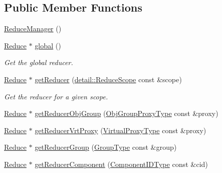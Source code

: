 \subsection*{Public Member Functions}
\begin{DoxyCompactItemize}
\item 
\hyperlink{structvt_1_1collective_1_1reduce_1_1_reduce_manager_a28e777d1b70bc4e2d369db4ed3df76ab}{Reduce\+Manager} ()
\item 
\hyperlink{structvt_1_1collective_1_1reduce_1_1_reduce}{Reduce} $\ast$ \hyperlink{structvt_1_1collective_1_1reduce_1_1_reduce_manager_afa3c814ff0e1c7ef1a9f76ed4036512b}{global} ()
\begin{DoxyCompactList}\small\item\em Get the global reducer. \end{DoxyCompactList}\item 
\hyperlink{structvt_1_1collective_1_1reduce_1_1_reduce}{Reduce} $\ast$ \hyperlink{structvt_1_1collective_1_1reduce_1_1_reduce_manager_ad502c08497db1a1d811e1cad034f4891}{get\+Reducer} (\hyperlink{structvt_1_1collective_1_1reduce_1_1detail_1_1_reduce_scope}{detail\+::\+Reduce\+Scope} const \&scope)
\begin{DoxyCompactList}\small\item\em Get the reducer for a given scope. \end{DoxyCompactList}\item 
\hyperlink{structvt_1_1collective_1_1reduce_1_1_reduce}{Reduce} $\ast$ \hyperlink{structvt_1_1collective_1_1reduce_1_1_reduce_manager_a712bf763fda2a663e87edc524f99839f}{get\+Reducer\+Obj\+Group} (\hyperlink{namespacevt_ad7cae989df485fccca57f0792a880a8e}{Obj\+Group\+Proxy\+Type} const \&proxy)
\item 
\hyperlink{structvt_1_1collective_1_1reduce_1_1_reduce}{Reduce} $\ast$ \hyperlink{structvt_1_1collective_1_1reduce_1_1_reduce_manager_aa6a24ee9cccbc984031bc834471429a9}{get\+Reducer\+Vrt\+Proxy} (\hyperlink{namespacevt_a1b417dd5d684f045bb58a0ede70045ac}{Virtual\+Proxy\+Type} const \&proxy)
\item 
\hyperlink{structvt_1_1collective_1_1reduce_1_1_reduce}{Reduce} $\ast$ \hyperlink{structvt_1_1collective_1_1reduce_1_1_reduce_manager_afedfe0dbb9fcbe6120a310ac8f4ad9b0}{get\+Reducer\+Group} (\hyperlink{namespacevt_a27b5e4411c9b6140c49100e050e2f743}{Group\+Type} const \&group)
\item 
\hyperlink{structvt_1_1collective_1_1reduce_1_1_reduce}{Reduce} $\ast$ \hyperlink{structvt_1_1collective_1_1reduce_1_1_reduce_manager_ae154a987a32dfa8c86e0391a2915579d}{get\+Reducer\+Component} (\hyperlink{namespacevt_ab6ac935c168b809c422d5121da4f2700}{Component\+I\+D\+Type} const \&cid)

\end{DoxyCompactItemize}
